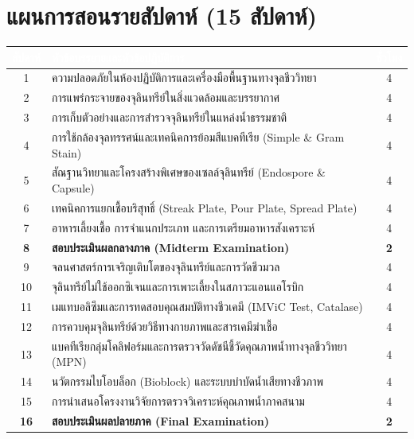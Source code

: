 \vspace{0.4cm}

\section*{แผนการสอนรายสัปดาห์ (15 สัปดาห์)}

\noindent\begin{tabularx}{\textwidth}{|c|>{\raggedright\arraybackslash}X|c|}
\hline
\rowcolor{waterNavy}
\textcolor{white}{\textbf{สัปดาห์}} & \textcolor{white}{\textbf{หัวข้อบรรยายและหัวข้อปฏิบัติการ}} & \textcolor{white}{\textbf{ชั่วโมง}} \\
\hline
1 & ความปลอดภัยในห้องปฏิบัติการและเครื่องมือพื้นฐานทางจุลชีววิทยา & 4 \\
\hline
2 & การแพร่กระจายของจุลินทรีย์ในสิ่งแวดล้อมและบรรยากาศ & 4 \\
\hline
3 & การเก็บตัวอย่างและการสำรวจจุลินทรีย์ในแหล่งน้ำธรรมชาติ & 4 \\
\hline
4 & การใช้กล้องจุลทรรศน์และเทคนิคการย้อมสีแบคทีเรีย (Simple \& Gram Stain) & 4 \\
\hline
5 & สัณฐานวิทยาและโครงสร้างพิเศษของเซลล์จุลินทรีย์ (Endospore \& Capsule) & 4 \\
\hline
6 & เทคนิคการแยกเชื้อบริสุทธิ์ (Streak Plate, Pour Plate, Spread Plate) & 4 \\
\hline
7 & อาหารเลี้ยงเชื้อ การจำแนกประเภท และการเตรียมอาหารสังเคราะห์ & 4 \\
\hline
\rowcolor{cleanSky!50!white}
\textbf{8} & \textbf{สอบประเมินผลกลางภาค (Midterm Examination)} & \textbf{2} \\
\hline
9 & จลนศาสตร์การเจริญเติบโตของจุลินทรีย์และการวัดชีวมวล & 4 \\
\hline
10 & จุลินทรีย์ไม่ใช้ออกซิเจนและการเพาะเลี้ยงในสภาวะแอนแอโรบิก & 4 \\
\hline
11 & เมแทบอลิซึมและการทดสอบคุณสมบัติทางชีวเคมี (IMViC Test, Catalase) & 4 \\
\hline
12 & การควบคุมจุลินทรีย์ด้วยวิธีทางกายภาพและสารเคมีฆ่าเชื้อ & 4 \\
\hline
13 & แบคทีเรียกลุ่มโคลิฟอร์มและการตรวจวัดดัชนีชี้วัดคุณภาพน้ำทางจุลชีววิทยา (MPN) & 4 \\
\hline
14 & นวัตกรรมไบโอบล็อก (Bioblock) และระบบบำบัดน้ำเสียทางชีวภาพ & 4 \\
\hline
15 & การนำเสนอโครงงานวิจัยการตรวจวิเคราะห์คุณภาพน้ำภาคสนาม & 4 \\
\hline
\rowcolor{cleanSky!50!white}
\textbf{16} & \textbf{สอบประเมินผลปลายภาค (Final Examination)} & \textbf{2} \\
\hline
\end{tabularx}

\clearpage
